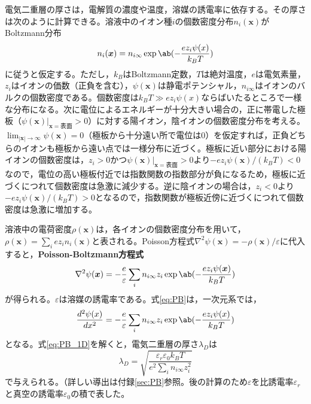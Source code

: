 \documentclass[autodetect-engine,dvi=dvipdfmx,a4paper,ja=standard,oneside,openany,11pt]{bxjsbook}
\begin{document}
電気二重層の厚さは，電解質の濃度や温度，溶媒の誘電率に依存する。その厚さは次のように計算できる\cite{足立泰久2013電気二重層とコロイド分散系の凝集}。溶液中のイオン種$i$の個数密度分布$n_i(\bm{x})$がBoltzmann分布
\begin{equation}
  n_i(\bm{x}) = n_{i\infty}\exp\ab(-\frac{ez_i\psi(x)}{k_BT})
  \label{eq:boltzmann}
\end{equation}
に従うと仮定する。ただし，$k_B$はBoltzmann定数，$T$は絶対温度，$e$は電気素量，$z_i$はイオンの価数（正負を含む），$\psi(\bm{x})$は静電ポテンシャル，$n_{i\infty}$はイオンのバルクの個数密度である。個数密度は$k_B T\gg ez_i\psi(x)$ならばいたるところで一様な分布になる。次に電位によるエネルギーが十分大きい場合の，正に帯電した極板（$\psi(\bm{x})|_{\bm{x}=\mathrm{表面}}>0$）に対する陽イオン，陰イオンの個数密度分布を考える。$\lim_{|\bm{x}|\to\infty}\psi(\bm{x})=0$（極板から十分遠い所で電位は0）を仮定すれば，正負どちらのイオンも極板から遠い点では一様分布に近づく。極板に近い部分における陽イオンの個数密度は，$z_i>0$かつ$\psi(\bm{x})|_{\bm{x}=\mathrm{表面}}>0$より$-ez_i\psi(\bm{x})/(k_BT)<0$なので，電位の高い極板付近では指数関数の指数部分が負になるため，極板に近づくにつれて個数密度は急激に減少する。逆に陰イオンの場合は，$z_i<0$より$-ez_i\psi(\bm{x})/(k_BT)>0$となるので，指数関数が極板近傍に近づくにつれて個数密度は急激に増加する。

溶液中の電荷密度$\rho(\bm{x})$は，各イオンの個数密度分布を用いて，$\rho(\bm{x})=\sum_{i}ez_in_i(\bm{x})$と表される。Poisson方程式$\nabla^2\psi(\bm{x})=-\rho(\bm{x})/\varepsilon$に代入すると，\textbf{Poisson-Boltzmann方程式}
\begin{equation}
  \nabla^2\psi(\bm{x}) = -\frac{e}{\varepsilon}\sum_{i}n_{i\infty}z_i\exp\ab(-\frac{ez_i\psi(\bm{x})}{k_BT})
  \label{eq:PB}
\end{equation}
が得られる。$\varepsilon$は溶媒の誘電率である。式\eqref{eq:PB}は，一次元系では，
\begin{equation}
  \frac{d^2\psi(x)}{dx^2} = -\frac{e}{\varepsilon}\sum_{i}n_{i\infty}z_i\exp\ab(-\frac{ez_i\psi(x)}{k_BT})
  \label{eq:PB_1D}
\end{equation}
となる。式\eqref{eq:PB_1D}を解くと，電気二重層の厚さ$\lambda_D$は
\begin{equation}
  \lambda_D = \sqrt{\frac{\varepsilon_r\varepsilon_0 k_BT}{e^2\sum_{i}n_{i\infty}z_i^2}}\label{eq:debye_length}
\end{equation}
で与えられる。（詳しい導出は付録\ref{sec:PB}参照。後の計算のため$\varepsilon$を比誘電率$\varepsilon_r$と真空の誘電率$\varepsilon_0$の積で表した。
\end{document}

